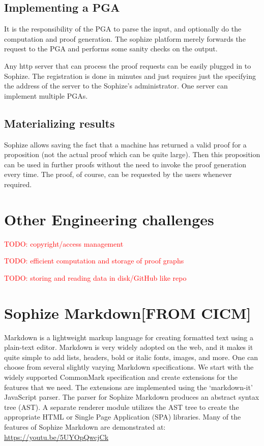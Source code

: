 \documentclass[a4paper]{article}
\newcommand\todo[1]{\textcolor{red}{TODO: #1}}
\begin{document}
\subsection{Implementing a PGA}
It is the responsibility of the PGA to parse the input, and optionally do the computation and proof generation. The sophize platform merely forwards the request to the PGA and performs some sanity checks on the output.

Any http server that can process the proof requests can be easily plugged in to Sophize. The registration is done in minutes and just requires just the specifying the address of the server to the Sophize's administrator. One server can implement multiple PGAs.


\subsection{Materializing results}

Sophize allows saving the fact that a machine has returned a valid proof for a proposition (not the actual proof which can be quite large). Then this proposition can be used in further proofs without the need to invoke the proof generation every time. The proof, of course, can be requested by the users whenever required.


\section{Other Engineering challenges}
\todo{copyright/access management}

\todo{efficient computation and storage of proof graphs}

\todo{ storing and reading data in disk/GitHub like repo }


\section{Sophize Markdown[FROM CICM]}

Markdown is a lightweight markup language for creating formatted text using a plain-text editor. Markdown is very widely adopted on the web, and it makes it quite simple to add lists, headers, bold or italic fonts, images, and more. One can choose from several slightly varying Markdown specifications. We start with the widely supported CommonMark specification and create extensions for the features that we need. The extensions are implemented using the `markdown-it' \cite{markdown_it} JavaScript parser. The parser for Sophize Markdown produces an abstract syntax tree (AST). A separate renderer module utilizes the AST tree to create the appropriate HTML or Single Page Application (SPA) libraries. Many of the features of Sophize Markdown are demonstrated at: \url{https://youtu.be/5UYOpQwcjCk}
\end{document}

